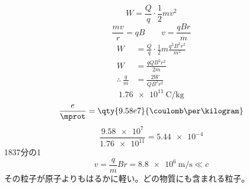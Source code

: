 \[ W=\frac{Q}{q}\cdot\frac{1}{2}mv^{2} \]
\[ \frac{mv}{r}=qB\qquad v=\frac{qBr}{m} \]
\begin{align*}
  W&=\frac{Q}{q}\cdot\frac{1}{2}m\frac{q^{2}B^{2}r^{2}}{m^{2}}\\
  W&=\frac{qQB^{2}r^{2}}{2m}\\
  \therefore\ \frac{q}{m}&=\frac{2W}{QB^{2}r^{2}}
\end{align*}
\[ \qty{1.76e11}{\coulomb\per\kilogram} \]
\[ \frac{e}{\mprot}=\qty{9.58e7}{\coulomb\per\kilogram} \]
\[ \frac{\num{9.58e7}}{\num{1.76e11}}=\num{5.44e-4} \]
1837分の1
\[ v=\frac{q}{m}Br=\qty{8.8e6}{\metre\per\second}\ll c \]
その粒子が原子よりもはるかに軽い。どの物質にも含まれる粒子。
